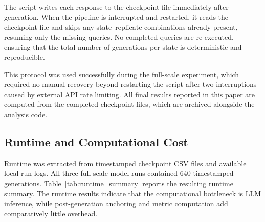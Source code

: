 \documentclass[11pt]{article}
\begin{document}
The script writes each response to the checkpoint file immediately after generation. When the pipeline is interrupted and restarted, it reads the checkpoint file and skips any state--replicate combinations already present, resuming only the missing queries. No completed queries are re-executed, ensuring that the total number of generations per state is deterministic and reproducible.

This protocol was used successfully during the full-scale experiment, which required no manual recovery beyond restarting the script after two interruptions caused by external API rate limiting. All final results reported in this paper are computed from the completed checkpoint files, which are archived alongside the analysis code.

\subsection{Runtime and Computational Cost}
\label{app:runtime}

Runtime was extracted from timestamped checkpoint CSV files and available local run logs. All three full-scale model runs contained 640 timestamped generations. Table~\ref{tab:runtime_summary} reports the resulting runtime summary. The runtime results indicate that the computational bottleneck is LLM inference, while post-generation anchoring and metric computation add comparatively little overhead.
\end{document}
